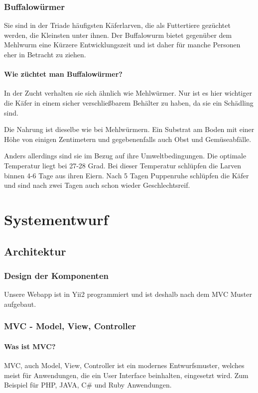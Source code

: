 \subsection{Buffalowürmer}
Sie sind in der Triade häufigsten Käferlarven, die als Futtertiere gezüchtet werden, die Kleinsten unter ihnen. Der Buffalowurm bietet gegenüber dem Mehlwurm eine Kürzere Entwicklungszeit und ist daher für manche Personen eher in Betracht zu ziehen.
\subsubsection{Wie züchtet man Buffalowürmer?}
In der Zucht verhalten sie sich ähnlich wie Mehlwürmer. Nur ist es hier wichtiger die Käfer in einem sicher verschließbarem Behälter zu haben, da sie ein Schädling sind.

Die Nahrung ist dieselbe wie bei Mehlwürmern. Ein Substrat am Boden mit einer Höhe von einigen Zentimetern und gegebenenfalls auch Obst und Gemüseabfälle.

Anders allerdings sind sie im Bezug auf ihre Umweltbedingungen. Die optimale Temperatur liegt bei 27-28 Grad. Bei dieser Temperatur schlüpfen die Larven binnen 4-6 Tage aus ihren Eiern. Nach 5 Tagen Puppenruhe schlüpfen die Käfer und sind nach zwei Tagen auch schon wieder Geschlechtsreif.



\chapter{Systementwurf}

\section{Architektur}
\def \currentAuthor{Florian Tipotsch}
\subsection{Design der Komponenten}

Unsere Webapp ist in Yii2 programmiert und ist deshalb nach dem MVC Muster aufgebaut.
\subsection{MVC - Model, View, Controller}\label{sec:MVC}

\subsubsection{Was ist MVC?} 
MVC, auch Model, View, Controller ist ein modernes Entwurfsmuster, welches meist für Anwendungen, die ein User Interface beinhalten, eingesetzt wird. Zum Beispiel für PHP, JAVA, C\# und Ruby Anwendungen. \cite{MVC}

